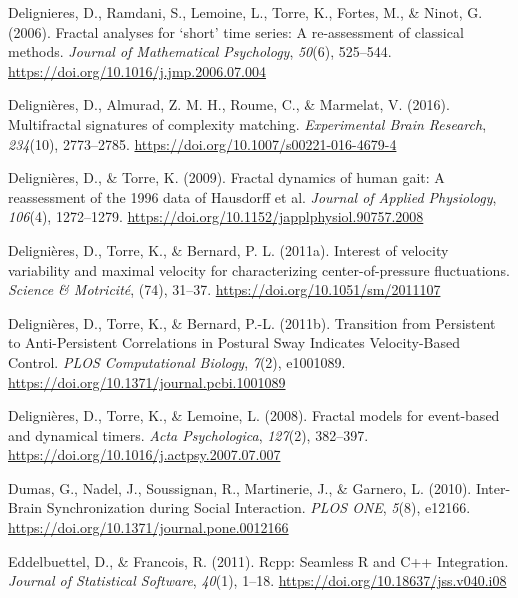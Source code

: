 \documentclass[
  man]{apa6}
\newlength{\cslhangindent}
\newlength{\cslentryspacingunit} %
\newenvironment{CSLReferences}[2] %
 {%
  \setlength{\parindent}{0pt}
  \ifodd #1
  \let\oldpar\par
  \def\par{\hangindent=\cslhangindent\oldpar}
  \fi
  \setlength{\parskip}{#2\cslentryspacingunit}
 }%
 {}
\begin{document}
\begin{CSLReferences}{1}{0}
\leavevmode{}%
Delignieres, D., Ramdani, S., Lemoine, L., Torre, K., Fortes, M., \& Ninot, G. (2006). Fractal analyses for {`}short{'} time series: A re-assessment of classical methods. \emph{Journal of Mathematical Psychology}, \emph{50}(6), 525--544. \url{https://doi.org/10.1016/j.jmp.2006.07.004}

\leavevmode{}%
Delignières, D., Almurad, Z. M. H., Roume, C., \& Marmelat, V. (2016). Multifractal signatures of complexity matching. \emph{Experimental Brain Research}, \emph{234}(10), 2773--2785. \url{https://doi.org/10.1007/s00221-016-4679-4}

\leavevmode{}%
Delignières, D., \& Torre, K. (2009). Fractal dynamics of human gait: A reassessment of the 1996 data of {Hausdorff} et al. \emph{Journal of Applied Physiology}, \emph{106}(4), 1272--1279. \url{https://doi.org/10.1152/japplphysiol.90757.2008}

\leavevmode{}%
Delignières, D., Torre, K., \& Bernard, P. L. (2011a). Interest of velocity variability and maximal velocity for characterizing center-of-pressure fluctuations. \emph{Science \& Motricité}, (74), 31--37. \url{https://doi.org/10.1051/sm/2011107}

\leavevmode{}%
Delignières, D., Torre, K., \& Bernard, P.-L. (2011b). Transition from {Persistent} to {Anti}-{Persistent} {Correlations} in {Postural} {Sway} {Indicates} {Velocity}-{Based} {Control}. \emph{PLOS Computational Biology}, \emph{7}(2), e1001089. \url{https://doi.org/10.1371/journal.pcbi.1001089}

\leavevmode{}%
Delignières, D., Torre, K., \& Lemoine, L. (2008). Fractal models for event-based and dynamical timers. \emph{Acta Psychologica}, \emph{127}(2), 382--397. \url{https://doi.org/10.1016/j.actpsy.2007.07.007}

\leavevmode{}%
Dumas, G., Nadel, J., Soussignan, R., Martinerie, J., \& Garnero, L. (2010). Inter-{Brain} {Synchronization} during {Social} {Interaction}. \emph{PLOS ONE}, \emph{5}(8), e12166. \url{https://doi.org/10.1371/journal.pone.0012166}

\leavevmode{}%
Eddelbuettel, D., \& Francois, R. (2011). Rcpp: {Seamless} {R} and {C}++ {Integration}. \emph{Journal of Statistical Software}, \emph{40}(1), 1--18. \url{https://doi.org/10.18637/jss.v040.i08}


\end{CSLReferences}
\end{document}
